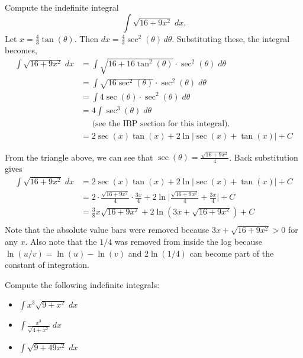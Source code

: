 \documentclass{ximera}
\begin{document}
\begin{example}
Compute the indefinite integral
\[
\int \sqrt{16 + 9x^2} \; dx.
\]
Let $x = \frac43 \tan(\theta)$. Then $dx = \frac43 \sec^2(\theta) \, d\theta$.
Substituting these, the integral becomes,
\begin{align*}
\int \sqrt{16 + 9x^2} \; dx &= \int \sqrt{16+16\tan^2(\theta)} \cdot \sec^2(\theta) \; d\theta\\
                            &= \int \sqrt{16\sec^2(\theta)} \cdot \sec^2(\theta) \; d\theta\\
                            &= \int 4\sec(\theta) \cdot \sec^2(\theta) \; d\theta\\
                            &= 4\int \sec^3(\theta) \; d\theta\\
                            &\;\;\;\;\;\text{(see the IBP section for this integral).}\\
                            &= 2 \sec(x) \tan(x) + 2 \ln|\sec(x) + \tan(x)| + C
\end{align*}
                            

From the triangle above, we can see that $\sec(\theta) = \frac{\sqrt{16+9x^2}}{4 }$. Back substitution gives
\begin{align*}
\int \sqrt{16 + 9x^2} \; dx &= 2 \sec(x) \tan(x) + 2 \ln|\sec(x) + \tan(x)| + C\\
                            &=  2 \cdot\frac{\sqrt{16+9x^2}}{4 } \cdot \frac{3x}{4}  + 2 \ln\bigg|\frac{\sqrt{16+9x^2}}{4 } + \frac{3x}{4}\bigg| + C\\
                            &=   \frac38 x\sqrt{16+9x^2}  + 2 \ln\left(3x +  \sqrt{16+9x^2}\right) + C\\
\end{align*}
Note that the absolute value bars were removed because $3x +  \sqrt{16+9x^2} > 0$ for any $x$. Also note that the $1/4$ was removed from inside the log 
because $\ln(u/v) = \ln(u) - \ln(v)$ and $2\ln(1/4)$ can become part of the constant of integration.
\end{example}


\begin{problem}
Compute the following indefinite integrals:
\begin{itemize}
\item $\displaystyle{\int   x^3\sqrt{9 + x^2}\; dx}$
\item $\displaystyle{\int   \frac{x^3}{\sqrt{4 + x^2}} \; dx}$
\item $\displaystyle{\int \sqrt{9 + 49x^2} \; dx}$
\end{itemize}

\end{problem}







\begin{center}
\begin{foldable}
\end{foldable}
\end{center}
\end{document}

